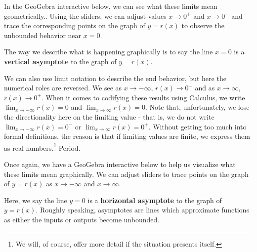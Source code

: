 \documentclass{ximera}
\begin{document}
In the GeoGebra interactive below, we can see what these limits mean geometrically..  Using the sliders, we can adjust values $x \rightarrow 0^{+}$ and $x \rightarrow 0^{-}$ and trace the corresponding points on the graph of $y = r(x)$ to observe the unbounded behavior near $x = 0$.


\begin{center}
\end{center}

The way we describe what is happening graphically is to say the line $x = 0$ is a  \textbf{vertical asymptote}  to the graph of $y = r(x)$.


We can also use limit notation to describe the end behavior, but here the numerical roles are reversed.  We see as $x \rightarrow -\infty$, $r(x) \rightarrow 0^{-}$ and as $x \rightarrow \infty$, $r(x) \rightarrow 0^{+}$.  When it comes to codifying these results using Calculus, we write $\lim_{x \rightarrow -\infty} r(x) =  0$ and $\lim_{x \rightarrow \infty} r(x) =  0$.  Note that, unfortunately, we lose the directionality here on the limiting value - that is, we do not write $\lim_{x \rightarrow -\infty} r(x) =  0^{-}$ or $\lim_{x \rightarrow \infty} r(x) =  0^{+}$.  Without getting too much into formal definitions, the reason is that if limiting values are finite, we express them as real numbers.\footnote{We will, of course, offer more detail if the situation presents itself.}  Period.

Once again, we have a GeoGebra interactive below to help us visualize what these limits mean graphically.  We can adjust sliders to trace points on the graph of $y = r(x)$ as $x \rightarrow -\infty$ and $x \rightarrow \infty$.


\begin{center}
\end{center}


Here, we say the line $y = 0$ is a \textbf{horizontal asymptote} to the graph of $y = r(x)$.  Roughly speaking, asymptotes are lines which approximate functions as either the inputs or outputs become unbounded. 
\end{document}
